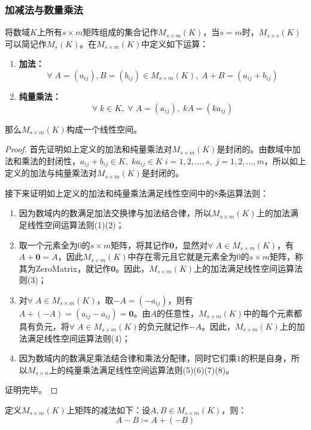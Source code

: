 \subsubsection{加减法与数量乘法}
\begin{definition}
	将数域$K$上所有$s\times m$矩阵组成的集合记作$M_{s\times m}(K)$，当$s=m$时，$M_{s\times s}(K)$可以简记作$M_s(K)$。在$M_{s\times m}(K)$中定义如下运算：
	\begin{enumerate}
		\item \textbf{加法：} 
		\begin{equation*}
			\forall\;A=(a_{ij}),B=(b_{ij})\in M_{s\times m}(K),\;A+B=(a_{ij}+b_{ij})
		\end{equation*}
		\item \textbf{纯量乘法：}
		\begin{equation*}
			\forall\;k\in K,\;\forall\;A=(a_{ij}),\;kA=(ka_{ij})
		\end{equation*}
	\end{enumerate}
	那么$M_{s\times m}(K)$构成一个线性空间。
\end{definition}
\begin{proof}
	首先证明如上定义的加法和纯量乘法对$M_{s\times m}(K)$是封闭的。由数域中加法和乘法的封闭性，$a_{ij}+b_{ij}\in K,\;ka_{ij}\in K\;i=1,2,\dots,s,\;j=1,2,\dots,m$，所以如上定义的加法与纯量乘法对$M_{s\times m}(K)$是封闭的。\par
	接下来证明如上定义的加法和纯量乘法满足线性空间中的8条运算法则：
	\begin{enumerate}
		\item 因为数域内的数满足加法交换律与加法结合律，所以$M_{s\times m}(K)$上的加法满足线性空间运算法则(1)(2)；
		\item 取一个元素全为$0$的$s\times m$矩阵，将其记作$\mathbf{0}$，显然对$\forall\;A\in M_{s\times m}(K)$，有$A+\mathbf{0}=A$，因此$M_{s\times m}(K)$中存在零元且它就是元素全为$0$的$s\times m$矩阵，称其为\gls{ZeroMatrix}，就记作$\mathbf{0}$。因此，$M_{s\times m}(K)$上的加法满足线性空间运算法则(3)；
		\item 对$\forall\;A\in M_{s\times m}(K)$，取$-A=(-a_{ij})$，则有$A+(-A)=(a_{ij}-a_{ij})=\mathbf{0}$。由$A$的任意性，$M_{s\times m}(K)$中的每个元素都具有负元，将$\forall\;A\in M_{s\times m}(K)$的负元就记作$-A$。因此，$M_{s\times m}(K)$上的加法满足线性空间运算法则(4)；
		\item 因为数域内的数满足乘法结合律和乘法分配律，同时它们乘$1$的积是自身，所以$M_{s\times n}$上的纯量乘法满足线性空间运算法则(5)(6)(7)(8)。
	\end{enumerate}
	证明完毕。
\end{proof}
\begin{definition}
	定义$M_{s\times m}(K)$上矩阵的减法如下：设$A,B\in M_{s\times m}(K)$，则：
	\begin{equation*}
		A-B\coloneq A+(-B)
	\end{equation*}
\end{definition}
